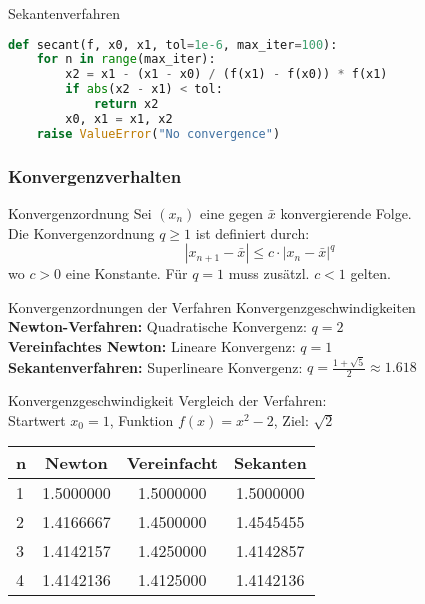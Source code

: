 \begin{examplecode}{Sekantenverfahren}
    \begin{lstlisting}[language=Python, style=basesmol]
def secant(f, x0, x1, tol=1e-6, max_iter=100):
    for n in range(max_iter):
        x2 = x1 - (x1 - x0) / (f(x1) - f(x0)) * f(x1)
        if abs(x2 - x1) < tol:
            return x2
        x0, x1 = x1, x2
    raise ValueError("No convergence")
    \end{lstlisting}
\end{examplecode}

\subsubsection{Konvergenzverhalten}

\begin{definition}{Konvergenzordnung}
    Sei $(x_n)$ eine gegen $\bar{x}$ konvergierende Folge. \\
    Die Konvergenzordnung $q \geq 1$ ist definiert durch:
    \vspace{-2mm}\\
    $$|x_{n+1}-\bar{x}| \leq c \cdot |x_n-\bar{x}|^q$$
    wo $c > 0$ eine Konstante. Für $q = 1$ muss zusätzl. $c < 1$ gelten.
\end{definition}

\begin{theorem}{Konvergenzordnungen der Verfahren} Konvergenzgeschwindigkeiten
    \vspace{-2mm}\\
    \textbf{Newton-Verfahren:} Quadratische Konvergenz: $q = 2$
    \vspace{1mm}\\
    \textbf{Vereinfachtes Newton:} Lineare Konvergenz: $q = 1$
    \vspace{1mm}\\
    \textbf{Sekantenverfahren:} Superlineare Konvergenz: $q = \frac{1+\sqrt{5}}{2} \approx 1.618$
\end{theorem}

\begin{example2}{Konvergenzgeschwindigkeit} Vergleich der Verfahren:
    \vspace{1mm}\\
    Startwert $x_0 = 1$, Funktion $f(x) = x^2 - 2$, Ziel: $\sqrt{2}$
    \begin{center}
    \begin{tabular}{l|c|c|c}
    n & Newton & Vereinfacht & Sekanten \\\hline
    1 & 1.5000000 & 1.5000000 & 1.5000000\\
    2 & 1.4166667 & 1.4500000 & 1.4545455\\
    3 & 1.4142157 & 1.4250000 & 1.4142857\\
    4 & 1.4142136 & 1.4125000 & 1.4142136
    \end{tabular}
    \end{center}
\end{example2}
